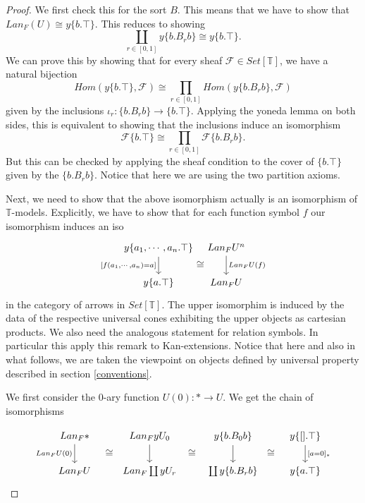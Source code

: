 \documentclass[a4paper]{amsproc}
\theoremstyle{plain}
\theoremstyle{definition}
\theoremstyle{remark}
\numberwithin{equation}{section}
\begin{document}
\begin{proof}
We first check this for the sort $B$. This means that we have to show that $Lan_F(U) \cong y \{b . \top\}$. This reduces to showing
\[
\coprod_{r \in [0,1]} y \{b . B_r b\} \cong y \{b . \top\} .
\]
We can prove this by showing that for every sheaf $\mathcal{F} \in Set[\mathbb{T}]$, we have a natural bijection
\[
Hom(y \{b . \top\}, \mathcal{F}) \cong \prod_{r \in [0,1]} Hom(y \{b . B_r b\}, \mathcal{F})
\]
given by the inclusions $\iota_r : \{b . B_r b\} \to \{b . \top\}$. Applying the yoneda lemma on both sides, this is equivalent to showing that the inclusions induce an isomorphism
\[
\mathcal{F} \{b . \top\} \cong \prod_{r \in [0,1]} \mathcal{F} \{b . B_r b\} .
\]
But this can be checked by applying the sheaf condition to the cover of $\{b . \top\}$ given by the $\{b . B_r b\}$. Notice that here we are using the two partition axioms.

Next, we need to show that the above isomorphism actually is an isomorphism of $\mathbb{T}$-models. Explicitly, we have to show that for each function symbol $f$ our isomorphism induces an iso
\[
\begin{tikzcd}[column sep=tiny]
    {y \{a_1,\cdots,a_n . \top \}} \arrow[d, "{[f(a_1,\cdots,a_n) = a]}"'] \arrow[r, "\cong"',phantom, shift right=7] & Lan_F U^n \arrow[d, "Lan_F U(f)"] \\
    y \{a . \top \}                                                                                           & Lan_F U                            
\end{tikzcd}
\]
in the category of arrows in $Set[\mathbb{T}]$. The upper isomorphim is induced by the data of the respective universal cones exhibiting the upper objects as cartesian products. We also need the analogous statement for relation symbols. In particular this apply this remark to Kan-extensions. Notice that here and also in what follows, we are taken the viewpoint on objects defined by universal property described in section \ref{conventions}. 

We first consider the 0-ary function $U(0): * \to U$. We get the chain of isomorphisms

\[
\begin{tikzcd}
Lan_F * \arrow[d, "Lan_F U(0)"'] \arrow[r, "\cong"',phantom, shift right=7] & Lan_F y U_0 \arrow[d] \arrow[r, "\cong"',phantom, shift right=7] & y \{b . B_0 b \} \arrow[d] \arrow[r, "\cong"',phantom, shift right=7] & {y \{[].\top\}} \arrow[d, "{[a=0]_*}"] \\
Lan_F U                                                             & Lan_F \coprod y U_r                                      & \coprod y \{ b . B_r b\}                                      & y\{a.\top\}                         
\end{tikzcd}
\]


\end{proof}
\end{document}
